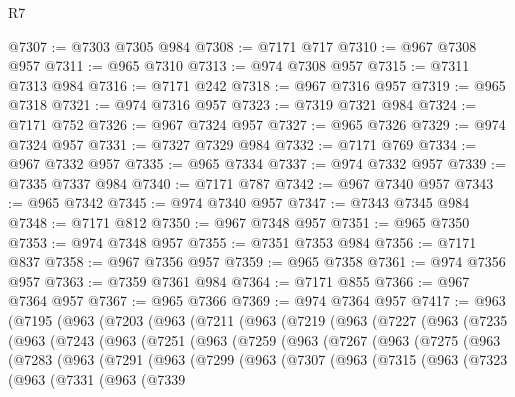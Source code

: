 \begin{lexlean}{R7}
\begin{coremodule}
@7307 := @7303 @7305 @984
@7308 := @7171 @717
@7310 := @967 @7308 @957
@7311 := @965 @7310
@7313 := @974 @7308 @957
@7315 := @7311 @7313 @984
@7316 := @7171 @242
@7318 := @967 @7316 @957
@7319 := @965 @7318
@7321 := @974 @7316 @957
@7323 := @7319 @7321 @984
@7324 := @7171 @752
@7326 := @967 @7324 @957
@7327 := @965 @7326
@7329 := @974 @7324 @957
@7331 := @7327 @7329 @984
@7332 := @7171 @769
@7334 := @967 @7332 @957
@7335 := @965 @7334
@7337 := @974 @7332 @957
@7339 := @7335 @7337 @984
@7340 := @7171 @787
@7342 := @967 @7340 @957
@7343 := @965 @7342
@7345 := @974 @7340 @957
@7347 := @7343 @7345 @984
@7348 := @7171 @812
@7350 := @967 @7348 @957
@7351 := @965 @7350
@7353 := @974 @7348 @957
@7355 := @7351 @7353 @984
@7356 := @7171 @837
@7358 := @967 @7356 @957
@7359 := @965 @7358
@7361 := @974 @7356 @957
@7363 := @7359 @7361 @984
@7364 := @7171 @855
@7366 := @967 @7364 @957
@7367 := @965 @7366
@7369 := @974 @7364 @957
@7417 := @963
    (@7195
      (@963
        (@7203
          (@963
            (@7211
              (@963
                (@7219
                  (@963
                    (@7227
                      (@963
                        (@7235
                          (@963
                            (@7243
                              (@963
                                (@7251
                                  (@963
                                    (@7259
                                      (@963
                                        (@7267
                                          (@963
                                            (@7275
                                              (@963
                                                (@7283
                                                  (@963
                                                    (@7291
                                                      (@963
                                                        (@7299
                                                          (@963
                                                            (@7307
                                                              (@963
                                                                (@7315
                                                                  (@963
                                                                    (@7323
                                                                      (@963
                                                                        (@7331
                                                                          (@963
                                                                            (@7339

\end{coremodule}
\end{lexlean}
